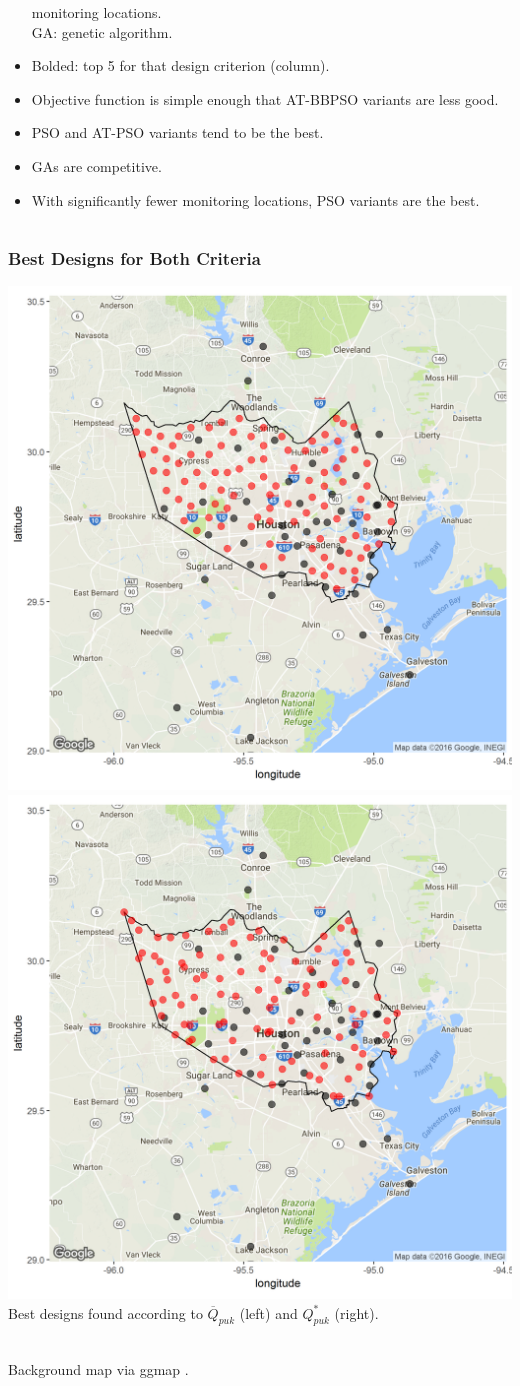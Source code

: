 \documentclass[xcolor=dvipsnames]{beamer}
\begin{document}
\begin{frame}
\begin{columns}
\begin{column}{0.55\textwidth}
\begin{itemize}
\hspace{1.42cm} monitoring locations.\\
GA: genetic algorithm.
\item Bolded: top 5 for that design criterion (column).\pause
\item Objective function is simple enough that AT-BBPSO variants are less good.\pause
\item PSO and AT-PSO variants tend to be the best. \pause
\item GAs are competitive. \pause
\item With significantly fewer monitoring locations, PSO variants are the best.
  \end{itemize}
\end{column}
\end{columns}
\end{frame}

\begin{frame}
\frametitle{Best Designs for Both Criteria}
{\centering
\includegraphics[width=.49\textwidth]{../doc/sig2pukmean.png}
\includegraphics[width=.49\textwidth]{../doc/sig2pukmax.png}
}\\
Best designs found according to $\overline{Q}_{puk}$ (left) and $Q^*_{puk}$ (right).\\~

Background map via ggmap \citep{ggmap2013}.

\end{frame}
\end{document}

